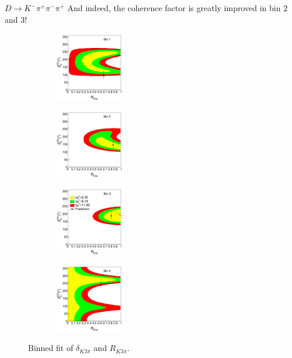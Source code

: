 \documentclass{beamer}
\begin{document}
\begin{frame}{$D\to K^-\pi^+\pi^-\pi^+$}
  \vspace{0.0cm}
  {\large And indeed, the coherence factor is greatly improved in bin $2$ and $3$!}
  \begin{figure}
    \centering
    \begin{subfigure}{0.5\textwidth}
      \centering
      \includegraphics[height=3.0cm,width=3.5cm]{Figures/K3pi_Binned_Fit_Bin1.pdf}
    \end{subfigure}%
    \begin{subfigure}{0.5\textwidth}
      \centering
      \includegraphics[height=3.0cm,width=3.5cm]{Figures/K3pi_Binned_Fit_Bin2.pdf}
    \end{subfigure}
    \begin{subfigure}{0.5\textwidth}
      \centering
      \includegraphics[height=3.0cm,width=3.5cm]{Figures/K3pi_Binned_Fit_Bin3.pdf}
    \end{subfigure}%
    \begin{subfigure}{0.5\textwidth}
      \centering
      \includegraphics[height=3.0cm,width=3.5cm]{Figures/K3pi_Binned_Fit_Bin4.pdf}
    \end{subfigure}
    \caption*{Binned fit of $\delta_{K3\pi}$ and $R_{K3\pi}$.}
  \end{figure}
\end{frame}
\end{document}
